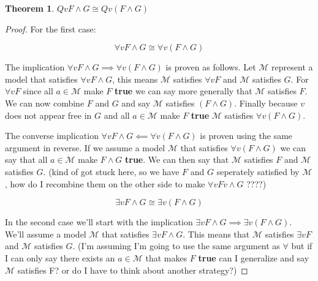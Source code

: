 \documentclass[a4paper,11pt]{article}
\newtheorem{thm}{Theorem}[section]
\begin{document}
\setcounter{equation}{0}

\pagebreak

\begin{thm}$Qv F \land G \cong Qv(F \land G)$\end{thm}

	\begin{proof}
		For the first case:
	
		\begin{equation} \forall v F \land G \cong \forall v(F \land G) \end{equation}
	
		The implication $\forall v F \land G \implies \forall v(F \land G)$ is proven as follows. 
		Let $\mathcal{M}$ represent a model
		that satisfies $\forall v F \land G$, this means $\mathcal{M}$ satisfies $\forall v F$ 
		and $\mathcal{M}$ satisfies $G$. For $\forall v F$ since all $a \in \mathcal{M}$ make
		$F$ \textbf{true} we can say more generally that $\mathcal{M}$ satisfies $F$. We can now
		combine $F$ and $G$ and say $\mathcal{M}$ satisfies $(F \land G)$. Finally because 
		$v$ does not appear free in $G$ and all $a \in \mathcal{M}$ make $F$ \textbf{true}
		$\mathcal{M}$ satisfies $\forall v(F \land G)$. 
		
		The converse implication $\forall v F \land G \impliedby \forall v(F \land G)$ is proven using 
		the same argument in reverse. If we assume a model $\mathcal{M}$ that satisfies 
		$\forall v(F \land G)$ we can say that all $a \in \mathcal{M}$ make $F \land G$ \textbf{true}.
		We can then say that $\mathcal{M}$ satisfies $F$ and $\mathcal{M}$ satisfies $G$. 
		(kind of got stuck here, so we have $F$ and $G$ seperately satisfied by $\mathcal{M}$, 
		how do I recombine them on the other side to make $\forall v Fv \land G$ ????)
		
		\begin{equation} \exists v F \land G \cong \exists v(F \land G) \end{equation}
		
		In the second case we'll start with the implication $\exists vF \land G \implies \exists v(F \land G)$.
		We'll assume a model $\mathcal{M}$ that satisfies $\exists vF \land G$. This means that 
		$\mathcal{M}$ satisfies $\exists vF$ and $\mathcal{M}$ satisfies $G$. (I'm assuming I'm going to 
		use the same argument as $\forall$ but if I can only say there exists an $a \in \mathcal{M}$ 
		that makes $F$ \textbf{true} can I generalize and say $\mathcal{M}$ satisfies F? or do I have to think 		about another strategy?)
		
 	\end{proof}
	
\end{document}
